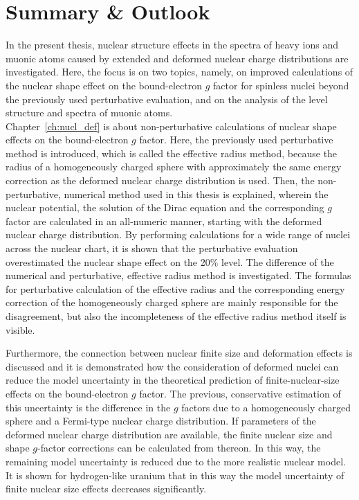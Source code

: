 \chapter*{Summary \& Outlook}
\label{ch:conclusion}

In the present thesis, nuclear structure effects in the spectra of heavy ions and muonic atoms caused by extended and deformed nuclear charge distributions are investigated. 
Here, the focus is on two topics, namely, on improved calculations of the nuclear shape effect on the bound-electron $g$ factor for spinless nuclei beyond the previously used perturbative evaluation, and on the analysis of the level structure and spectra of muonic atoms.\\[0.3cm]

Chapter~\ref{ch:nucl_def} is about non-perturbative calculations of nuclear shape effects on the bound-electron $g$ factor. Here, the previously used perturbative method is introduced, which is called the effective radius method, because the radius of a homogeneously charged sphere with approximately the same energy correction as the deformed nuclear charge distribution is used. 
Then, the non-perturbative, numerical method used in this thesis is explained, wherein the nuclear potential, the solution of the Dirac equation and the corresponding $g$ factor are calculated in an all-numeric manner, starting with the deformed nuclear charge distribution. By performing calculations for a wide range of nuclei across the nuclear chart, it is shown that the perturbative evaluation overestimated the nuclear shape effect on the 20\% level. The difference of the numerical and perturbative, effective radius method is investigated. The formulas for perturbative calculation of the effective radius and the corresponding energy correction of the homogeneously charged sphere are mainly responsible for the disagreement, but also the incompleteness of the effective radius method itself is visible.

Furthermore, the connection between nuclear finite size and deformation effects is discussed and it is demonstrated how the consideration of deformed nuclei can reduce the model uncertainty in the theoretical prediction of finite-nuclear-size effects on the bound-electron $g$ factor. The previous, conservative estimation of this uncertainty is the difference in the $g$ factors due to a homogeneously charged sphere and a Fermi-type nuclear charge distribution. If parameters of the deformed nuclear charge distribution are available, the finite nuclear size and shape $g$-factor corrections can be calculated from thereon. In this way, the remaining model uncertainty is reduced due to the more realistic nuclear model. It is shown for hydrogen-like uranium that in this way the model uncertainty of finite nuclear size effects decreases significantly.\\ 

